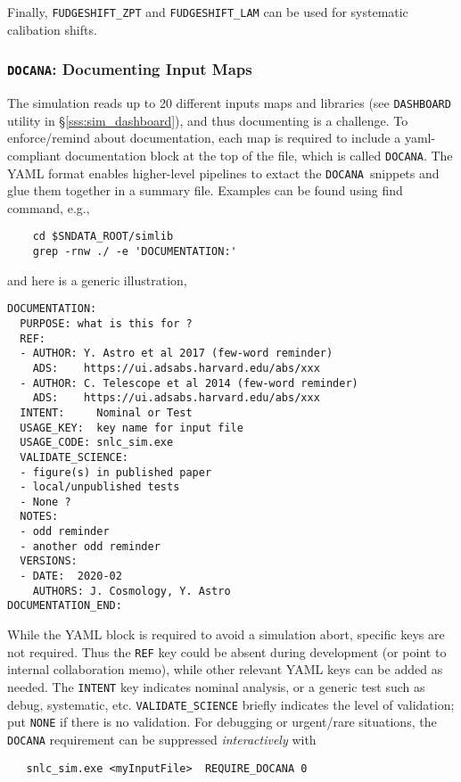 \documentclass[12pt]{article}
\newcommand{\DOCANA}{{\tt DOCANA}}
\begin{document}
\medskip
Finally, {\tt FUDGESHIFT\_ZPT} and {\tt FUDGESHIFT\_LAM}
can be used for systematic calibation shifts.


 \clearpage
  \subsubsection{{\DOCANA}: Documenting Input Maps}
  \label{sss:DOCANA}

The simulation reads up to 20 different inputs maps and libraries
(see {\tt DASHBOARD} utility in \S\ref{sss:sim_dashboard}),
and thus documenting is a challenge.
To enforce/remind about documentation, each map is required to 
include a yaml-compliant documentation block at the top of the file, 
which is called {\DOCANA}. The YAML format enables higher-level
pipelines to extact the \DOCANA\ snippets and glue them together
in a summary file. Examples can be found using find command, 
e.g., 
\vspace{-0.3cm}
\begin{verbatim}            
    cd $SNDATA_ROOT/simlib
    grep -rnw ./ -e 'DOCUMENTATION:'
\end{verbatim}             
%
and here is a generic illustration,
%
\vspace{-0.3cm}
\begin{verbatim}
DOCUMENTATION:
  PURPOSE: what is this for ?
  REF:
  - AUTHOR: Y. Astro et al 2017 (few-word reminder)
    ADS:    https://ui.adsabs.harvard.edu/abs/xxx    
  - AUTHOR: C. Telescope et al 2014 (few-word reminder)
    ADS:    https://ui.adsabs.harvard.edu/abs/xxx    
  INTENT:     Nominal or Test
  USAGE_KEY:  key name for input file
  USAGE_CODE: snlc_sim.exe 
  VALIDATE_SCIENCE: 
  - figure(s) in published paper
  - local/unpublished tests
  - None ? 
  NOTES:
  - odd reminder
  - another odd reminder
  VERSIONS:
  - DATE:  2020-02
    AUTHORS: J. Cosmology, Y. Astro
DOCUMENTATION_END:

\end{verbatim}
%
While the YAML block is required to avoid a simulation abort, 
specific keys are not required.
Thus the {\tt REF} key could be absent during development 
(or point to internal collaboration memo),
while other relevant YAML keys can be added as needed.
The {\tt INTENT} key indicates nominal analysis, or a
generic test such as debug, systematic, etc.
{\tt VALIDATE\_SCIENCE} briefly indicates the level of validation;
put {\tt NONE} if there is no validation.
For debugging or urgent/rare situations, 
the {\DOCANA} requirement can be suppressed {\it interactively} with
\vspace{-0.3cm}
\begin{verbatim}                           
   snlc_sim.exe <myInputFile>  REQUIRE_DOCANA 0
\end{verbatim}
%
\end{document}

